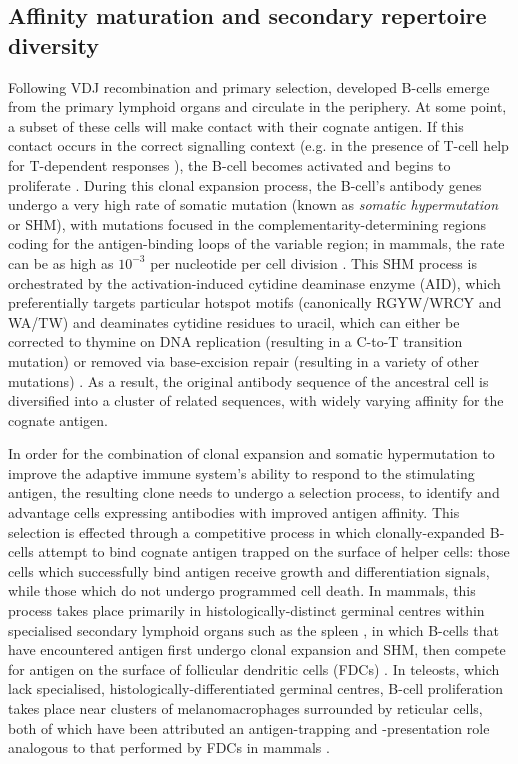 \subsection{Affinity maturation and secondary repertoire diversity}
\label{sec:intro_affinity_maturation}

Following VDJ recombination and primary selection, developed \naive B-cells emerge from the primary lymphoid organs and circulate in the periphery. At some point, a subset of these \naive cells will make contact with their cognate antigen. If this contact occurs in the correct signalling context (e.g. in the presence of T-cell help for T-dependent responses \parencite{sompayrac2019immune}), the B-cell becomes activated and begins to proliferate \parencite{dunnwalters2010bcellageing}. During this clonal expansion process, the B-cell's antibody genes undergo a very high rate of somatic mutation (known as \textit{somatic hypermutation} or SHM), with mutations focused in the complementarity-determining regions coding for the antigen-binding loops of the variable region; in mammals, the rate can be as high as $10^{-3}$ per nucleotide per cell division \parencite{noia2007shm}. This SHM process is orchestrated by the activation-induced cytidine deaminase enzyme (AID), which preferentially targets particular hotspot motifs (canonically  RGYW/WRCY and WA/TW) and deaminates cytidine residues to uracil, which can either be corrected to thymine on DNA replication (resulting in a C-to-T transition mutation) or removed via base-excision repair (resulting in a variety of other mutations) \parencite{magor2015affinity}. As a result, the original antibody sequence of the ancestral \naive cell is diversified into a cluster of related sequences, with widely varying affinity for the cognate antigen.

In order for the combination of clonal expansion and somatic hypermutation to improve the adaptive immune system's ability to respond to the stimulating antigen, the resulting clone needs to undergo a selection process, to identify and advantage cells expressing antibodies with improved antigen affinity. This selection is effected through a competitive process in which clonally-expanded B-cells attempt to bind cognate antigen trapped on the surface of helper cells: those cells which successfully bind antigen receive growth and differentiation signals, while those which do not undergo programmed cell death. In mammals, this process takes place primarily in histologically-distinct germinal centres within specialised secondary lymphoid organs such as the spleen \parencite{victora2012gc}, in which B-cells that have encountered antigen first undergo clonal expansion and SHM, then compete for antigen on the surface of follicular dendritic cells (FDCs) \parencite{howard2006quality,victora2012gc}. In teleosts, which lack specialised, histologically-differentiated germinal centres, B-cell proliferation takes place near clusters of melanomacrophages surrounded by reticular cells, both of which have been attributed an antigen-trapping and -presentation role analogous to that performed by FDCs in mammals \parencite{magor2015affinity}.

